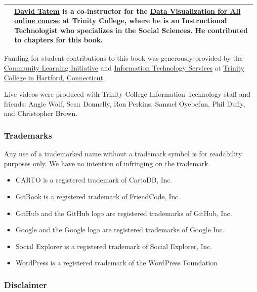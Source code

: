 \documentclass[
  english,
]{book}
\providecommand{\tightlist}{%
  \setlength{\itemsep}{0pt}\setlength{\parskip}{0pt}}
\begin{document}
\begin{longtable}[]{@{}ll@{}}
\begin{minipage}[t]{0.50\columnwidth}
\end{minipage} & \begin{minipage}[t]{0.44\columnwidth}\raggedright
\href{http://www.trincoll.edu/LITC/its/about/Pages/Learn.aspx}{David Tatem} is a co-instructor for the \href{http://www.datavizforall.org/enroll}{Data Visualization for All online course} at Trinity College, where he is an Instructional Technologist who specializes in the Social Sciences. He contributed to chapters for this book.\strut
\end{minipage}\tabularnewline
\bottomrule
\end{longtable}

Funding for student contributions to this book was generously provided by the \href{https://cher.trincoll.edu/community-learning/}{Community Learning Initiative} and \href{https://www.trincoll.edu/LITC/its/}{Information Technology Services} at \href{http://www.trincoll.edu}{Trinity College in Hartford, Connecticut}.

Live videos were produced with Trinity College Information Technology staff and friends: Angie Wolf, Sean Donnelly, Ron Perkins, Samuel Oyebefun, Phil Duffy, and Christopher Brown.

\hypertarget{trademarks}{%
\subsubsection*{Trademarks}\label{trademarks}}

Any use of a trademarked name without a trademark symbol is for readability purposes only. We have no intention of infringing on the trademark.

\begin{itemize}
\tightlist
\item
  CARTO is a registered trademark of CartoDB, Inc.
\item
  GitBook is a registered trademark of FriendCode, Inc.
\item
  GitHub and the GitHub logo are registered trademarks of GitHub, Inc.
\item
  Google and the Google logo are registered trademarks of Google Inc.
\item
  Social Explorer is a registered trademark of Social Explorer, Inc.
\item
  WordPress is a registered trademark of the WordPress Foundation
\end{itemize}

\hypertarget{disclaimer}{%
\subsubsection*{Disclaimer}\label{disclaimer}}
\end{document}
